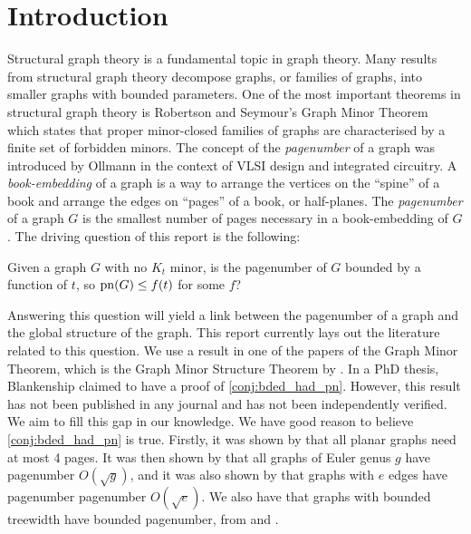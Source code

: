 \chapter{Introduction}\label{sec:introduction}
Structural graph theory is a fundamental topic in graph theory. Many results from structural graph theory decompose graphs, or families of graphs, into smaller graphs with bounded parameters. One of the most important theorems in structural graph theory is Robertson and Seymour's Graph Minor Theorem \cite{robertsonGraphMinorsXX2004} which states that proper minor-closed families of graphs are characterised by a finite set of forbidden minors.
The concept of the \textit{pagenumber} of a graph was introduced by Ollmann \cite{ollmannBookThicknessVarious1973} in the context of VLSI design and integrated circuitry. A \textit{book-embedding} of a graph is a way to arrange the vertices on the ``spine'' of a book and arrange the edges on ``pages'' of a book, or half-planes. The \textit{pagenumber} of a graph \(G\) is the smallest number of pages necessary in a book-embedding of \(G\).
The driving question of this report is the following:
\begin{conjecture}\label{conj:bded_had_pn}
	Given a graph \(G\) with no \(K_t\) minor, is the pagenumber of \(G\) bounded by a function of \(t\), so \(\operatorname{pn}(G) \leq f(t)\) for some \(f\)?
\end{conjecture}
Answering this question will yield a link between the pagenumber of a graph and the global structure of the graph. This report currently lays out the literature related to this question. We use a result in one of the papers of the Graph Minor Theorem, which is the Graph Minor Structure Theorem by \textcite{robertsonGraphMinorsXVI2003}.
In a PhD thesis, Blankenship claimed to have a proof of \cref{conj:bded_had_pn}.\cite{Blankenship-PhD03} However, this result has not been published in any journal and has not been independently verified. We aim to fill this gap in our knowledge.
We have good reason to believe \cref{conj:bded_had_pn} is true. Firstly, it was shown by \textcite{yannakakisEmbeddingPlanarGraphs1989} that all planar graphs need at most 4 pages. It was then shown by \textcite{malitzGenusGraphsHave1994} that all graphs of Euler genus $g$ have pagenumber $O(\sqrt{g})$, and it was also shown by \textcite{malitzGraphsEdgesHave1994} that graphs with $e$ edges have pagenumber pagenumber $O(\sqrt{e})$. We also have that graphs with bounded treewidth have bounded pagenumber, from \textcite{ganleyPagenumberTrees2001} and \textcite{dujmovicGraphTreewidthGeometric2007}.
